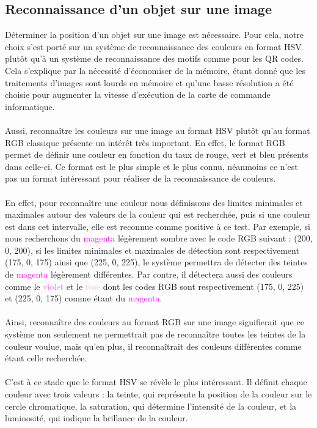 \documentclass{article}
\begin{document}
    \subsection{Reconnaissance d'un objet sur une image}
    \label{sec:Reconnaissance d'un objet sur une image}
       Déterminer la position d'un objet sur une image est nécessaire. Pour cela, notre choix s'est porté sur un système de reconnaissance des couleurs en format HSV plutôt qu'à un système de reconnaissance des motifs comme pour les QR codes. Cela s'explique par la nécessité d'économiser de la mémoire, étant donné que les traitements d'images sont lourds en mémoire et qu'une basse résolution a été choisie pour augmenter la vitesse d'exécution de la carte de commande informatique.
\\\\
Aussi, reconnaître les couleurs sur une image au format HSV plutôt qu'au format RGB classique présente un intérêt très important. En effet, le format RGB permet de définir une couleur en fonction du taux de rouge, vert et bleu présents dans celle-ci. Ce format est le plus simple et le plus connu, néanmoins ce n'est pas un format intéressant pour réaliser de la reconnaissance de couleurs.
        \\\\
        En effet, pour reconnaître une couleur nous définissons des limites minimales et maximales autour des valeurs de la couleur qui est recherchée, puis si une couleur est dans cet intervalle, elle est reconnue comme positive à ce test. Par exemple, si nous recherchons du \textcolor{magenta}{magenta} légèrement sombre avec le code RGB suivant : (200, 0, 200), si les limites minimales et maximales de détection sont respectivement (175, 0, 175) ainsi que (225, 0, 225), le système permettra de détecter des teintes de \textcolor{magenta}{magenta} légèrement différentes. Par contre, il détectera aussi des couleurs comme le \textcolor{violet}{violet} et le \textcolor{pink}{rose} dont les codes RGB sont respectivement (175, 0, 225) et (225, 0, 175) comme étant du \textcolor{magenta}{magenta}.
        \\\\
        Ainsi, reconnaître des couleurs au format RGB sur une image signifierait que ce système non seulement ne permettrait pas de reconnaître toutes les teintes de la couleur voulue, mais qu'en plus, il reconnaîtrait des couleurs différentes comme étant celle recherchée.
        \\\\
C'est à ce stade que le format HSV se révèle le plus intéressant. Il définit chaque couleur avec trois valeurs : la teinte, qui représente la position de la couleur sur le cercle chromatique, la saturation, qui détermine l'intensité de la couleur, et la luminosité, qui indique la brillance de la couleur.
\end{document}
